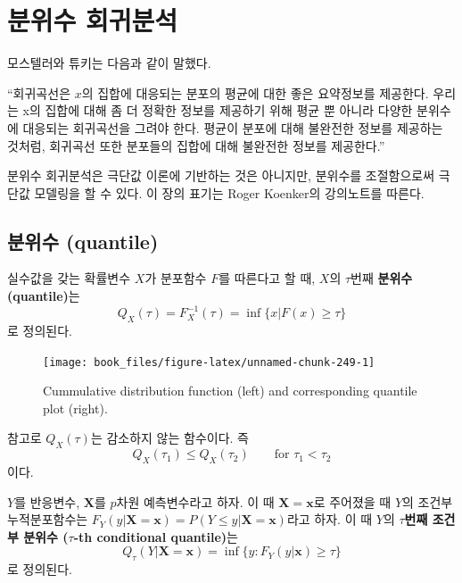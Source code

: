 \documentclass[b5paper,]{scrbook}
\theoremstyle{plain}
\theoremstyle{definition}
\numberwithin{equation}{section}
\let\BeginKnitrBlock\begin \let\EndKnitrBlock\end
\begin{document}
\chapter{분위수 회귀분석}\label{qr}

모스텔러와 튜키는 다음과 같이 말했다.

``회귀곡선은 \(x\)의 집합에 대응되는 분포의 평균에 대한 좋은 요약정보를
제공한다. 우리는 x의 집합에 대해 좀 더 정확한 정보를 제공하기 위해 평균
뿐 아니라 다양한 분위수에 대응되는 회귀곡선을 그려야 한다. 평균이 분포에
대해 불완전한 정보를 제공하는 것처럼, 회귀곡선 또한 분포들의 집합에 대해
불완전한 정보를 제공한다.''

분위수 회귀분석은 극단값 이론에 기반하는 것은 아니지만, 분위수를
조절함으로써 극단값 모델링을 할 수 있다. 이 장의 표기는 Roger Koenker의
강의노트를 따른다.

\section{분위수 (quantile)}\label{-quantile}

\BeginKnitrBlock{definition}[분위수]
\protect\hypertarget{def:unnamed-chunk-248}{}{\label{def:unnamed-chunk-248}
{} }실수값을 갖는 확률변수 \(X\)가 분포함수 \(F\)를
따른다고 할 때, \(X\)의 \(\tau\)번째 \textbf{분위수(quantile)}는
\[Q_{X}(\tau)=F_{X}^{-1}(\tau)=\inf\{x|F(x)\geq \tau\}\] 로 정의된다.
\EndKnitrBlock{definition}

\begin{figure}

{\centering \texttt{[image: book\_files/figure-latex/unnamed-chunk-249-1]} 

}

\caption{Cummulative distribution function (left) and corresponding quantile plot (right).}\label{fig:unnamed-chunk-249}
\end{figure}

참고로 \(Q_{X}(\tau)\)는 감소하지 않는 함수이다. 즉
\[Q_{X}(\tau_{1}) \leq Q_{X}(\tau_{2}) \qquad{ \text{for } \tau_{1} < \tau_{2}}\]
이다.

\BeginKnitrBlock{definition}[조건부 분위수]
\protect\hypertarget{def:unnamed-chunk-250}{}{\label{def:unnamed-chunk-250}
{} }\(Y\)를 반응변수, \(\mathbf{X}\)를
\(p\)차원 예측변수라고 하자. 이 때 \(\mathbf{X}=\mathbf{x}\)로 주어졌을
때 \(Y\)의 조건부 누적분포함수는
\(F_{Y}(y|\mathbf{X}=\mathbf{x})=P(Y\leq y|\mathbf{X}=\mathbf{x})\)라고
하자. 이 때 \(Y\)의 \(\tau\)\textbf{번째 조건부 분위수
(}\(\tau\)\textbf{-th conditional quantile)}는
\[Q_{\tau}(Y|\mathbf{X}=\mathbf{x})=\inf\{y:F_{Y}(y|\mathbf{x})\geq \tau\}\]
로 정의된다.
\EndKnitrBlock{definition}
\end{document}
